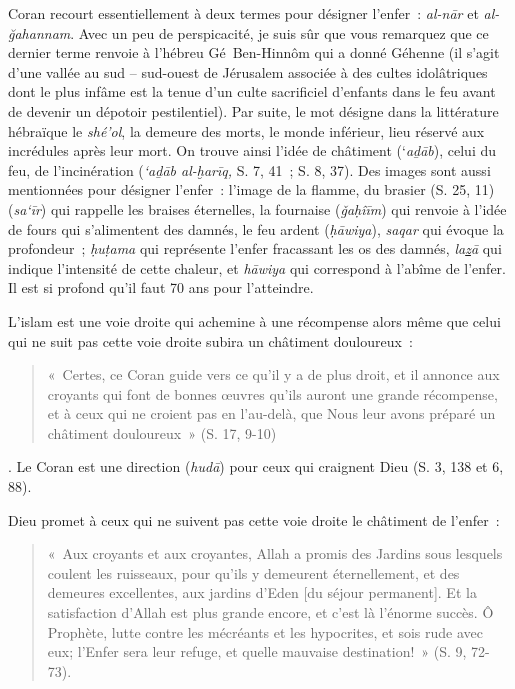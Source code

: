 Coran recourt essentiellement à deux termes pour désigner l'enfer~:
\emph{al-nār} et \emph{al-ğahannam}. Avec un peu de perspicacité, je
suis sûr que vous remarquez que ce dernier terme renvoie à l'hébreu
Gé~Ben-Hinnôm qui a donné Géhenne (il s'agit d'une vallée au sud --
sud-ouest de Jérusalem associée à des cultes idolâtriques dont le plus
infâme est la tenue d'un culte sacrificiel d'enfants dans le feu avant
de devenir un dépotoir pestilentiel). Par suite, le mot désigne dans la
littérature hébraïque le \emph{shé'ol}, la demeure des morts, le monde
inférieur, lieu réservé aux incrédules après leur mort. On trouve ainsi
l'idée de châtiment (`\emph{aḏāb}), celui du feu, de l'incinération
(\emph{`aḏāb al-ḫarīq,} S. 7, 41~; S. 8, 37). Des images sont aussi
mentionnées pour désigner l'enfer~: l'image de la flamme, du brasier (S.
25, 11) (\emph{sa`īr}) qui rappelle les braises éternelles, la fournaise
(\emph{ǧaḥîīm}) qui renvoie à l'idée de fours qui s'alimentent des
damnés, le feu ardent (\emph{ḥāwiya}), \emph{saqar} qui évoque la
profondeur~; \emph{ḥuṭama} qui représente l'enfer fracassant les os des
damnés, \emph{la\underline{z}ā} qui indique l'intensité de cette
chaleur, et \emph{hāwiya} qui correspond à l'abîme de l'enfer. Il est si
profond qu'il faut 70 ans pour l'atteindre.

L'islam est une voie droite qui achemine à une récompense alors même que
celui qui ne suit pas cette voie droite subira un châtiment douloureux~:
\begin{quote}
    «~Certes, ce Coran guide vers ce qu'il y a de plus droit, et il annonce
aux croyants qui font de bonnes œuvres qu'ils auront une grande
récompense, et à ceux qui ne croient pas en l'au-delà, que Nous leur
avons préparé un châtiment douloureux~» (S. 17, 9-10)
\end{quote}
. Le Coran est une
direction (\emph{hudā}) pour ceux qui craignent Dieu (S. 3, 138 et 6,
88).

Dieu promet à ceux qui ne suivent pas cette voie droite le châtiment de
l'enfer~: 
\begin{quote}
    «~Aux croyants et aux croyantes, Allah a promis des Jardins
sous lesquels coulent les ruisseaux, pour qu'ils y demeurent
éternellement, et des demeures excellentes, aux jardins d'Eden {[}du
séjour permanent{]}. Et la satisfaction d'Allah est plus grande encore,
et c'est là l'énorme succès. Ô Prophète, lutte contre les mécréants et
les hypocrites, et sois rude avec eux; l'Enfer sera leur refuge, et
quelle mauvaise destination!~» (S. 9, 72-73).
\end{quote}

